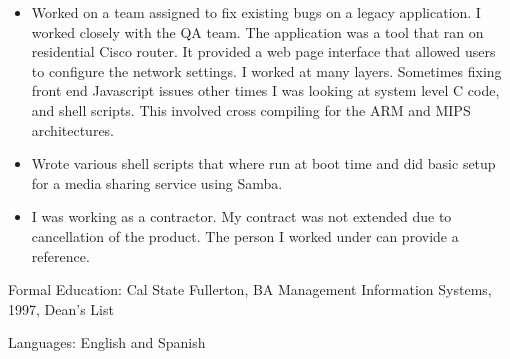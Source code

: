 \documentclass{res}
\begin{document}
\begin{resume}
\begin{itemize}
  \item
    Worked on a team assigned to fix existing bugs on a legacy
    application.  I worked closely with the QA team.  The application was
    a tool that ran on residential Cisco router.  It provided a web page
    interface that allowed users to configure the network settings. I
    worked at many layers.  Sometimes fixing front end Javascript issues
    other times I was looking at system level C code, and shell scripts.
    This involved cross compiling for the ARM and MIPS architectures.

  \item
    Wrote various shell scripts that where run at boot time and did
    basic setup for a media sharing service using Samba.

  \item
    I was working as a contractor.  My contract was not extended due to
    cancellation of the product.  The person I worked
    under can provide a reference.

  \end{itemize}


  Formal Education: Cal State Fullerton, BA Management Information
  Systems, 1997, Dean's List

  Languages: English and Spanish

\end{resume}
\end{document}
